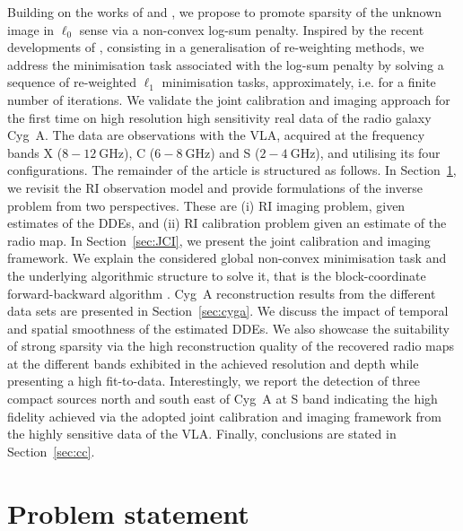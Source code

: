 \documentclass[fleqn,usenatbib]{mnras}
\begin{document}
Building on the works of \citet{Repetti2017} and \citet{Thouvenin2018}, we propose to promote sparsity of the unknown image in $\ell_0$ sense via a {non-convex} log-sum penalty. Inspired by the recent developments of \citet{Repetti2019b}, consisting in a generalisation of re-weighting methods, we address the minimisation task {associated with} the log-sum penalty by solving a sequence of re-weighted $\ell_1$ minimisation tasks, approximately, i.e. for a finite number of iterations. We validate the joint calibration and imaging approach for the first time on high resolution high sensitivity real data of the radio galaxy Cyg~A. The data are observations with the {{VLA}}, acquired at the frequency bands X ($8-12~$GHz), C ($6-8~$GHz) and S ($2-4~$GHz), and {utilising} its four configurations.
The remainder of the article is structured as follows. In Section~\ref{sec:pb}, we revisit the RI observation model and provide formulations of the inverse problem from two perspectives. These are (i) RI imaging problem, given estimates of the DDEs, and (ii) RI calibration problem given an estimate of the radio map. In Section~\ref{sec:JCI}, we present the joint calibration and imaging framework. We explain the considered global non-convex minimisation task and the underlying algorithmic structure to solve it, that is the block-coordinate forward-backward
algorithm \citep{Chouzenoux2016}. Cyg~A reconstruction results from the different data sets are presented in Section~\ref{sec:cyga}. We discuss the impact of temporal and spatial smoothness of the estimated DDEs. We also showcase the suitability of strong sparsity via the high reconstruction quality of the recovered radio maps at the different bands exhibited in the achieved resolution and {depth} while presenting a high fit-to-data. Interestingly, we report the detection of three compact sources north and south east of Cyg~A at S band indicating the high fidelity achieved via the adopted joint calibration and imaging framework from the highly sensitive data of the {{VLA}}. Finally, conclusions are stated in Section~\ref{sec:cc}.
\section{Problem statement} \label{sec:pb}
\end{document}
